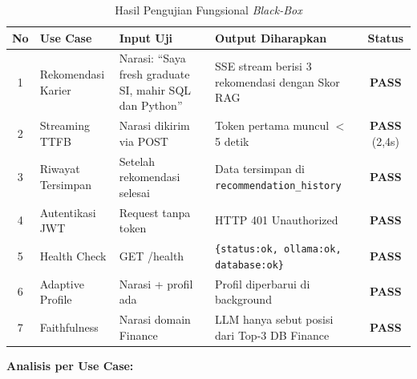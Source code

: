 \begin{table}[H]
\centering
\caption{Hasil Pengujian Fungsional \textit{Black-Box}}
\label{tab:blackbox}
\begin{tabularx}{\textwidth}{clXXc}
\toprule
\textbf{No} & \textbf{Use Case} & \textbf{Input Uji} & \textbf{Output Diharapkan} & \textbf{Status} \\
\midrule
1 & Rekomendasi Karier & Narasi: ``Saya fresh graduate SI, mahir SQL dan Python'' &
  SSE stream berisi 3 rekomendasi dengan Skor RAG & \textbf{PASS} \\
2 & Streaming TTFB & Narasi dikirim via POST &
  Token pertama muncul $<$ 5 detik & \textbf{PASS} (2,4s) \\
3 & Riwayat Tersimpan & Setelah rekomendasi selesai &
  Data tersimpan di \texttt{recommendation\_history} & \textbf{PASS} \\
4 & Autentikasi JWT & Request tanpa token &
  HTTP 401 Unauthorized & \textbf{PASS} \\
5 & Health Check & GET /health &
  \texttt{\{status:ok, ollama:ok, database:ok\}} & \textbf{PASS} \\
6 & Adaptive Profile & Narasi + profil ada &
  Profil diperbarui di background & \textbf{PASS} \\
7 & Faithfulness & Narasi domain Finance &
  LLM hanya sebut posisi dari Top-3 DB Finance & \textbf{PASS} \\
\bottomrule
\end{tabularx}
\end{table}

\textbf{Analisis per Use Case:}

